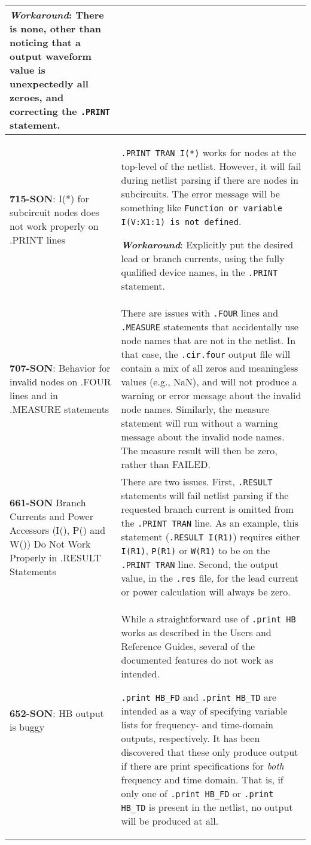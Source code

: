 {\begin{longtable}[h] {>{\raggedright\small}m{2in}|>{\raggedright\let\\\tabularnewline\small}m{3.5in}}
\textbf{\textit{Workaround}}: There is none, other than noticing that a output waveform value is 
unexpectedly all zeroes, and correcting the \texttt{.PRINT} statement. \\ \hline

\textbf{715-SON}: I(*) for subcircuit nodes does not work properly on .PRINT lines & 
\texttt{.PRINT TRAN I(*)} works for nodes at the top-level of the netlist.  However, it will
fail during netlist parsing if there are nodes in subcircuits.  The error message will be 
something like \texttt{Function or variable I(V:X1:1) is not defined}.

\textbf{\textit{Workaround}}: Explicitly put the desired lead or branch currents, using the
fully qualified device names, in the \texttt{.PRINT} statement. \\ \hline

\textbf{707-SON}: Behavior for invalid nodes on .FOUR lines and in .MEASURE statements &
There are issues with \texttt{.FOUR} lines and \texttt{.MEASURE} statements that accidentally
use node names that are not in the netlist.  In that case, the \texttt{.cir.four} output file 
will contain a mix of all zeros and meaningless values (e.g., NaN), and \Xyce{} will not produce a warning or error 
message about the invalid node names.  Similarly, the measure statement will run without a 
warning message about the invalid node names.  The measure result will then be zero, rather than 
FAILED. \\ \hline

\textbf{661-SON} Branch Currents and Power Accessors (I(), P() and W()) Do Not Work 
Properly in .RESULT Statements  & There are two issues.  First, \texttt{.RESULT} statements 
will fail netlist parsing if the requested branch current is omitted from the \texttt{.PRINT TRAN} 
line.  As an example, this statement (\texttt{.RESULT I(R1)}) requires either \texttt{I(R1)},
\texttt{P(R1)} or \texttt{W(R1)} to be on the \texttt{.PRINT TRAN} line.  Second, the
output value, in the \texttt{.res} file, for the lead current or power calculation will 
always be zero.
\\ \hline 

\textbf{652-SON}: HB output is buggy & While a straightforward use of \texttt{.print HB} works as described in the \Xyce{} Users and Reference Guides, several of the documented features do not work as intended.

\texttt{.print HB\_FD} and \texttt{.print HB\_TD} are intended as a way of specifying variable lists for frequency- and time-domain outputs, respectively.  It has been discovered that these only produce output if there are print specifications for {\em both\/} frequency and time domain.  That is, if only one of \texttt{.print HB\_FD} or \texttt{.print HB\_TD} is present in the netlist, no output will be produced at all.   


\end{longtable}}
